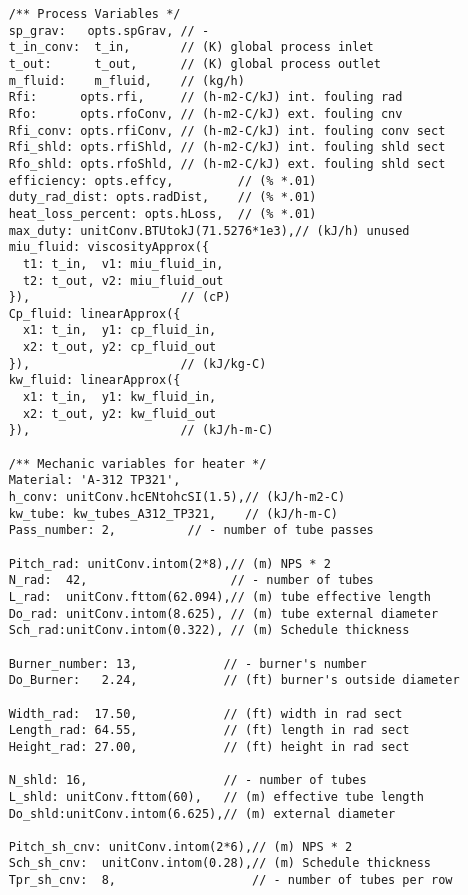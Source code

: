 \begin{verbatim}
    /** Process Variables */
    sp_grav:   opts.spGrav, // -
    t_in_conv:  t_in,       // (K) global process inlet
    t_out:      t_out,      // (K) global process outlet
    m_fluid:    m_fluid,    // (kg/h) 
    Rfi:      opts.rfi,     // (h-m2-C/kJ) int. fouling rad
    Rfo:      opts.rfoConv, // (h-m2-C/kJ) ext. fouling cnv
    Rfi_conv: opts.rfiConv, // (h-m2-C/kJ) int. fouling conv sect
    Rfi_shld: opts.rfiShld, // (h-m2-C/kJ) int. fouling shld sect
    Rfo_shld: opts.rfoShld, // (h-m2-C/kJ) ext. fouling shld sect
    efficiency: opts.effcy,         // (% *.01)
    duty_rad_dist: opts.radDist,    // (% *.01)
    heat_loss_percent: opts.hLoss,  // (% *.01)
    max_duty: unitConv.BTUtokJ(71.5276*1e3),// (kJ/h) unused
    miu_fluid: viscosityApprox({
      t1: t_in,  v1: miu_fluid_in,
      t2: t_out, v2: miu_fluid_out
    }),                     // (cP)
    Cp_fluid: linearApprox({
      x1: t_in,  y1: cp_fluid_in,
      x2: t_out, y2: cp_fluid_out
    }),                     // (kJ/kg-C) 
    kw_fluid: linearApprox({
      x1: t_in,  y1: kw_fluid_in,
      x2: t_out, y2: kw_fluid_out
    }),                     // (kJ/h-m-C)
    
    /** Mechanic variables for heater */
    Material: 'A-312 TP321',
    h_conv: unitConv.hcENtohcSI(1.5),// (kJ/h-m2-C)
    kw_tube: kw_tubes_A312_TP321,    // (kJ/h-m-C)
    Pass_number: 2,          // - number of tube passes
    
    Pitch_rad: unitConv.intom(2*8),// (m) NPS * 2
    N_rad:  42,                    // - number of tubes 
    L_rad:  unitConv.fttom(62.094),// (m) tube effective length
    Do_rad: unitConv.intom(8.625), // (m) tube external diameter
    Sch_rad:unitConv.intom(0.322), // (m) Schedule thickness

    Burner_number: 13,            // - burner's number
    Do_Burner:   2.24,            // (ft) burner's outside diameter

    Width_rad:  17.50,            // (ft) width in rad sect
    Length_rad: 64.55,            // (ft) length in rad sect
    Height_rad: 27.00,            // (ft) height in rad sect
    
    N_shld: 16,                   // - number of tubes 
    L_shld: unitConv.fttom(60),   // (m) effective tube length
    Do_shld:unitConv.intom(6.625),// (m) external diameter 
    
    Pitch_sh_cnv: unitConv.intom(2*6),// (m) NPS * 2
    Sch_sh_cnv:  unitConv.intom(0.28),// (m) Schedule thickness
    Tpr_sh_cnv:  8,                   // - number of tubes per row


\end{verbatim}
